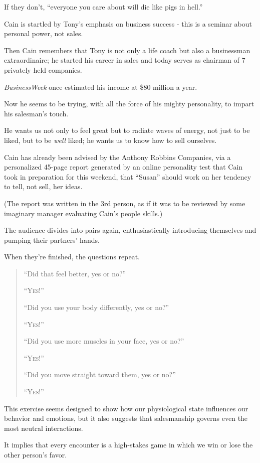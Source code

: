 \documentclass[oneside]{article}
\numberwithin{equation}{section}
\begin{document}
If they don't, ``everyone you care about will die like pigs in hell.''

%
Cain is startled by Tony's emphasis on business success - this is a seminar about personal power, not sales.

Then Cain remembers that Tony is not only a life coach but also a businessman extraordinaire; he started his career in sales and today serves as chairman of 7 privately held companies.

\textit{BusinessWeek} once estimated his income at \$80 million a year.

Now he seems to be trying, with all the force of his mighty personality, to impart his salesman's touch.

He wants us not only to feel great but to radiate waves of energy, not just to be liked, but to be \textit{well} liked; he wants us to know how to sell ourselves.

Cain has already been advised by the Anthony Robbins Companies, via a personalized 45-page report generated by an online personality test that Cain took in preparation for this weekend, that ``Susan'' should work on her tendency to tell, not sell, her ideas.

(The report was written in the 3rd person, as if it was to be reviewed by some imaginary manager evaluating Cain's people skills.)

%
The audience divides into pairs again, enthusiastically introducing themselves and pumping their partners' hands.

When they're finished, the questions repeat.
\begin{quotation}
    ``Did that feel better, yes or no?''
    
    ``\textsc{Yes!}''
    
    ``Did you use your body differently, yes or no?''
    
    ``\textsc{Yes!}''
    
    ``Did you use more muscles in your face, yes or no?''
    
    ``\textsc{Yes!}''
    
    ``Did you move straight toward them, yes or no?''
    
    ``\textsc{Yes!}''
\end{quotation}
%
This exercise seems designed to show how our physiological state influences our behavior and emotions, but it also suggests that salesmanship governs even the most neutral interactions.

It implies that every encounter is a high-stakes game in which we win or lose the other person's favor.
\end{document}
